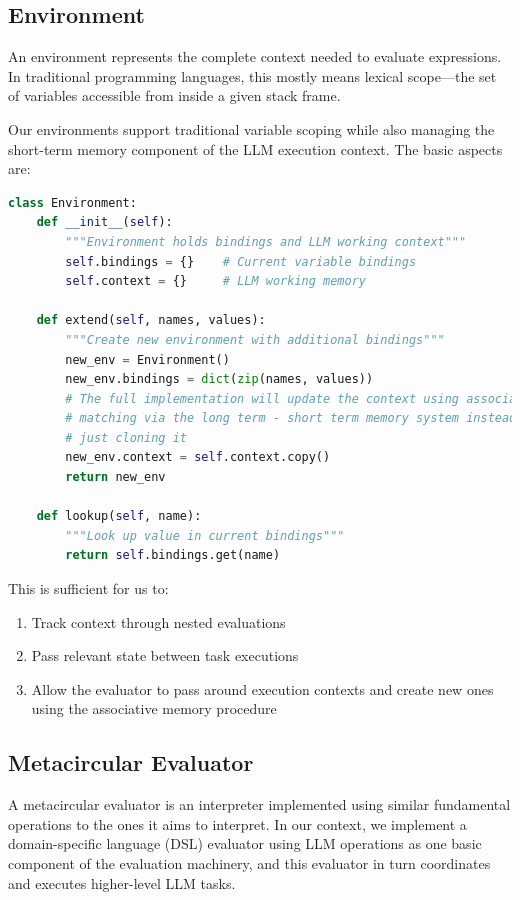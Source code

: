 \documentclass{article}
\begin{document}
\subsection{Environment}

An environment represents the complete context needed to evaluate expressions. In traditional programming languages, this mostly means lexical scope---the set of variables accessible from inside a given stack frame. %


Our environments support traditional variable scoping while also managing the short-term memory component of the LLM execution context. The basic aspects are:

\begin{lstlisting}[language=Python]
class Environment:
    def __init__(self):
        """Environment holds bindings and LLM working context"""
        self.bindings = {}    # Current variable bindings
        self.context = {}     # LLM working memory
    
    def extend(self, names, values):
        """Create new environment with additional bindings"""
        new_env = Environment()
        new_env.bindings = dict(zip(names, values))
        # The full implementation will update the context using associative
        # matching via the long term - short term memory system instead of 
        # just cloning it
        new_env.context = self.context.copy()  
        return new_env
    
    def lookup(self, name):
        """Look up value in current bindings"""
        return self.bindings.get(name)
\end{lstlisting}

This is sufficient for us to:
\begin{enumerate}
    \item Track context through nested evaluations
    \item Pass relevant state between task executions
    \item Allow the evaluator to pass around execution contexts and create new ones using the associative memory procedure
\end{enumerate}

\subsection{Metacircular Evaluator}

A metacircular evaluator is an interpreter implemented using similar fundamental operations to the ones it aims to interpret. In our context, we implement a domain-specific language (DSL) evaluator using LLM operations as one basic component of the evaluation machinery, and this evaluator in turn coordinates and executes higher-level LLM tasks.
\end{document}
